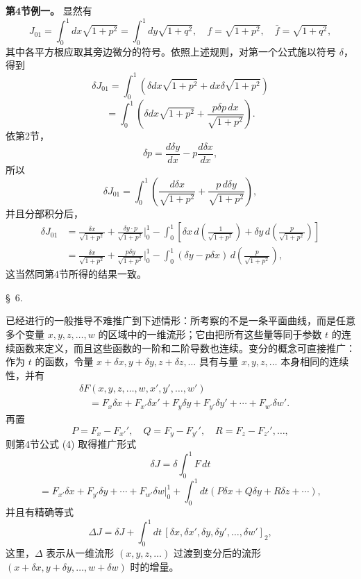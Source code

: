 \documentclass[11pt,a4paper,leqno]{article}
\begin{document}
\medskip
\noindent\textbf{第4节例一。} 显然有
\[
J_{01}=\int_0^1dx\sqrt{1+p^2}=\int_0^1dy\sqrt{1+q^2},\quad f=\sqrt{1+p^2},\quad \bar f=\sqrt{1+q^2},
\]
其中各平方根应取其旁边微分的符号。依照上述规则，对第一个公式施以符号 \(\delta\)，得到
\[
\delta J_{01}=\int_0^1\left(\delta dx\sqrt{1+p^2}+dx\delta\sqrt{1+p^2}\right)
\]
\[
=\int_0^1\left(\delta dx\sqrt{1+p^2}+\frac{p\delta p\,dx}{\sqrt{1+p^2}}\right).
\]
依第2节，
\[
\delta p=\frac{d\delta y}{dx}-p\frac{d\delta x}{dx},
\]
所以
\[
\delta J_{01}=\int_0^1\left(\frac{d\delta x}{\sqrt{1+p^2}}+\frac{p\,d\delta y}{\sqrt{1+p^2}}\right),
\]
并且分部积分后，
\[
\begin{aligned}
\delta J_{01}
&=\frac{\delta x}{\sqrt{1+p^2}}+\frac{\delta y\cdot p}{\sqrt{1+p^2}}\bigg|_0^1
-\int_0^1\left[\delta x\,d\left(\frac{1}{\sqrt{1+p^2}}\right)+\delta y\,d\left(\frac{p}{\sqrt{1+p^2}}\right)\right]\\
&=\frac{\delta x}{\sqrt{1+p^2}}+\frac{p\delta y}{\sqrt{1+p^2}}\bigg|_0^1
-\int_0^1(\delta y-p\delta x)\,d\left(\frac{p}{\sqrt{1+p^2}}\right),
\end{aligned}
\]
这当然同第4节所得的结果一致。

\begin{center}
\S~6.
\end{center}

已经进行的一般推导不难推广到下述情形：所考察的不是一条平面曲线，而是任意多个变量 \(x,y,z,\ldots,w\) 的区域中的一维流形；它由把所有这些量等同于参数 \(t\) 的连续函数来定义，而且这些函数的一阶和二阶导数也连续。变分的概念可直接推广：作为 \(t\) 的函数，令量 \(x+\delta x,y+\delta y,z+\delta z,\ldots\) 具有与量 \(x,y,z,\ldots\) 本身相同的连续性，并有
\[
\begin{aligned}
&\delta F(x,y,z,\ldots,w,x',y',\ldots,w')\\
&\quad=F_x\delta x+F_{x'}\delta x'+F_y\delta y+F_{y'}\delta y'+\cdots+F_{w'}\delta w'.
\end{aligned}
\]
再置
\[
P=F_x-F_{x'}',\quad Q=F_y-F_{y'}',\quad R=F_z-F_{z'}',\ldots,
\]
则第4节公式 (4) 取得推广形式
\[
\delta J=\delta\int_0^1F\,dt
\]
\[
=F_{x'}\delta x+F_{y'}\delta y+\cdots+F_{w'}\delta w\bigg|_0^1+\int_0^1dt(P\delta x+Q\delta y+R\delta z+\cdots),
\]
并且有精确等式
\[
\Delta J=\delta J+\int_0^1dt\,[\delta x,\delta x',\delta y,\delta y',\ldots,\delta w']_2,
\]
这里，\(\Delta\) 表示从一维流形 \((x,y,z,\ldots)\) 过渡到变分后的流形 \((x+\delta x,y+\delta y,\ldots,w+\delta w)\) 时的增量。
\end{document}
